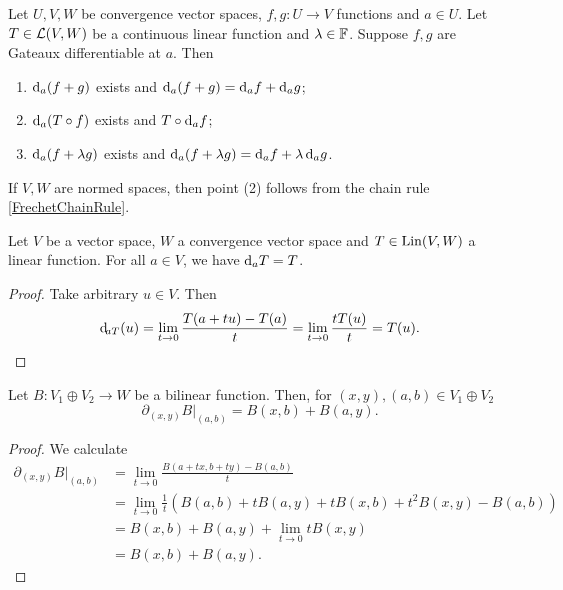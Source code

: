 \begin{corollary} \label{derivativeOfConstructions}
Let $U,V,W$ be convergence vector spaces, $f,g: U\to V$ functions and $a\in U$. Let $T\in \operatorname{\mathcal{L}}(V,W)$ be a continuous linear function and $\lambda \in \mathbb{F}$. Suppose $f,g$ are Gateaux differentiable at $a$. Then
\begin{enumerate}
\item $\operatorname{d \!}{_a(f+g)}$ exists and $\operatorname{d \!}{_a(f+g)} = \operatorname{d \!}{_af} + \operatorname{d \!}{_ag}$;
\item $\operatorname{d \!}{_a(T\circ f)}$ exists and $T\circ \operatorname{d \!}{_af}$;
\item $\operatorname{d \!}{_a(f+\lambda g)}$ exists and $\operatorname{d \!}{_a(f+\lambda g)} = \operatorname{d \!}{_af} + \lambda \operatorname{d \!}{_ag}$.
\end{enumerate}
\end{corollary}
If $V,W$ are normed spaces, then point (2) follows from the chain rule \ref{FrechetChainRule}.

\begin{lemma}
Let $V$ be a vector space, $W$ a convergence vector space and $T\in\operatorname{Lin}(V,W)$ a linear function. For all $a\in V$, we have $\operatorname{d \!}{_aT} = T$.
\end{lemma}
\begin{proof}
Take arbitrary $u\in V$. Then
\[ \operatorname{d \!}_{aT}(u) = \lim_{t\to 0} \frac{T(a+tu) - T(a)}{t} = \lim_{t\to 0} \frac{tT(u)}{t} = T(u). \]
\end{proof}

\begin{proposition} \label{derivativeBilinearFunction}
Let $B: V_1 \oplus V_2 \to W$ be a bilinear function. Then, for $(x,y),(a,b)\in V_1\oplus V_2$
\[ \partial_{(x,y)}B|_{(a,b)} = B(x,b) + B(a,y). \]
\end{proposition}
\begin{proof}
We calculate
\begin{align*}
\partial_{(x,y)}B|_{(a,b)} &= \lim_{t\to 0} \frac{B(a+tx, b+ty) - B(a,b)}{t} \\
&= \lim_{t\to 0} \frac{1}{t} (B(a,b) + tB(a,y) + tB(x,b) + t^2B(x,y) - B(a,b)) \\
&=B(x,b) + B(a,y) + \lim_{t\to 0} tB(x,y) \\
&= B(x,b) + B(a,y).
\end{align*}
\end{proof}

